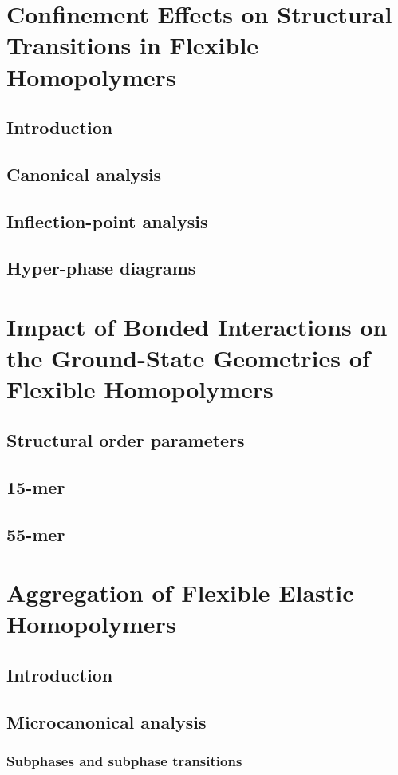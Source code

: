 \documentclass[12pt]{report}
\begin{document}
\chapter{Confinement Effects on Structural Transitions in Flexible Homopolymers}
\section{Introduction}
\section{Canonical analysis}
\section{Inflection-point analysis}
\section{Hyper-phase diagrams}

\chapter{Impact of Bonded Interactions on the Ground-State Geometries of Flexible Homopolymers}
\section{Structural order parameters}
\section{15-mer}
\section{55-mer}

\chapter{Aggregation of Flexible Elastic Homopolymers}
\section{Introduction}
\section{Microcanonical analysis}
\subsection{Subphases and subphase transitions}
\end{document}
